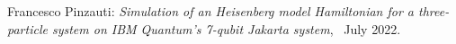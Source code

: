\thispagestyle{empty}

\hfill

\vfill

\noindent Francesco Pinzauti: \textit{Simulation of an Heisenberg model Hamiltonian for a three-particle
system on IBM Quantum's 7-qubit Jakarta system}, \textcopyright\ July 2022.
